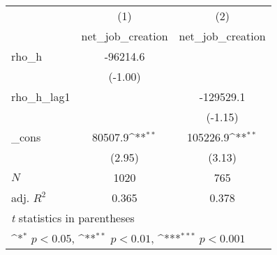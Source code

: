 {
\def\sym#1{\ifmmode^{#1}\else\(^{#1}\)\fi}
\begin{tabular}{l*{2}{c}}
\toprule
            &\multicolumn{1}{c}{(1)}&\multicolumn{1}{c}{(2)}\\
            &\multicolumn{1}{c}{net\_job\_creation}&\multicolumn{1}{c}{net\_job\_creation}\\
\midrule
rho\_h       &    -96214.6         &                     \\
            &     (-1.00)         &                     \\
\addlinespace
rho\_h\_lag1  &                     &   -129529.1         \\
            &                     &     (-1.15)         \\
\addlinespace
\_cons      &     80507.9\sym{**} &    105226.9\sym{**} \\
            &      (2.95)         &      (3.13)         \\
\midrule
\(N\)       &        1020         &         765         \\
adj. \(R^{2}\)&       0.365         &       0.378         \\
\bottomrule
\multicolumn{3}{l}{\footnotesize \textit{t} statistics in parentheses}\\
\multicolumn{3}{l}{\footnotesize \sym{*} \(p<0.05\), \sym{**} \(p<0.01\), \sym{***} \(p<0.001\)}\\
\end{tabular}
}

